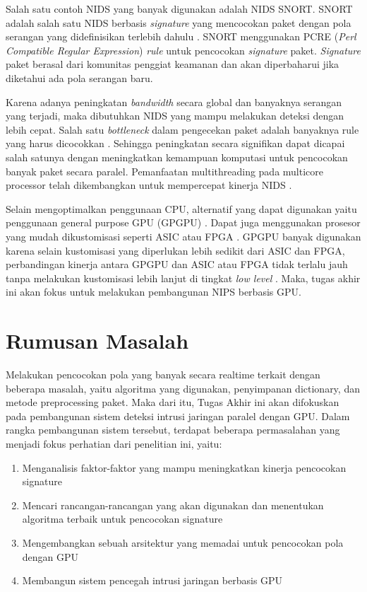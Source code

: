   Salah satu contoh NIDS yang banyak digunakan adalah NIDS SNORT. SNORT adalah salah satu NIDS berbasis \emph{signature} yang mencocokan paket dengan pola serangan yang didefinisikan terlebih dahulu \parencite{snort}. SNORT menggunakan PCRE (\emph{Perl Compatible Regular Expression}) \emph{rule} untuk pencocokan \emph{signature} paket. \emph{Signature} paket berasal dari komunitas penggiat keamanan dan akan diperbaharui jika diketahui ada pola serangan baru.

  Karena adanya peningkatan \emph{bandwidth} secara global dan banyaknya serangan yang terjadi, maka dibutuhkan NIDS yang mampu melakukan deteksi dengan lebih cepat. Salah satu \emph{bottleneck} dalam pengecekan paket adalah banyaknya rule yang harus dicocokkan \parencite{pcre2007}. Sehingga peningkatan secara signifikan dapat dicapai salah satunya dengan meningkatkan kemampuan komputasi untuk pencocokan banyak paket secara paralel. Pemanfaatan multithreading pada multicore processor telah dikembangkan untuk mempercepat kinerja NIDS \parencite{multi2004}.


  Selain mengoptimalkan penggunaan CPU, alternatif yang dapat digunakan yaitu penggunaan general purpose GPU (GPGPU) \parencite{4482891}. Dapat juga menggunakan prosesor yang mudah dikustomisasi seperti ASIC atau FPGA \parencite{fpga2008}. GPGPU banyak digunakan karena selain kustomisasi yang diperlukan lebih sedikit dari ASIC dan FPGA, perbandingan kinerja antara GPGPU dan ASIC atau FPGA tidak terlalu jauh tanpa melakukan kustomisasi lebih lanjut di tingkat \emph{low level} \parencite{gnort2008}. Maka, tugas akhir ini akan fokus untuk melakukan pembangunan NIPS berbasis GPU.

\section{Rumusan Masalah}

  Melakukan pencocokan pola yang banyak secara realtime terkait dengan beberapa masalah, yaitu algoritma yang digunakan, penyimpanan dictionary, dan metode preprocessing paket. Maka dari itu, Tugas Akhir ini akan difokuskan pada pembangunan sistem deteksi intrusi jaringan paralel dengan GPU. Dalam rangka pembangunan sistem tersebut, terdapat beberapa permasalahan yang menjadi fokus perhatian dari penelitian ini, yaitu:

  \begin{enumerate}
      \item Menganalisis faktor-faktor yang mampu meningkatkan kinerja pencocokan signature
      \item Mencari rancangan-rancangan yang akan digunakan dan menentukan algoritma terbaik untuk pencocokan signature
      \item Mengembangkan sebuah arsitektur yang memadai untuk pencocokan pola dengan GPU
      \item Membangun sistem pencegah intrusi jaringan berbasis GPU
  \end{enumerate}

